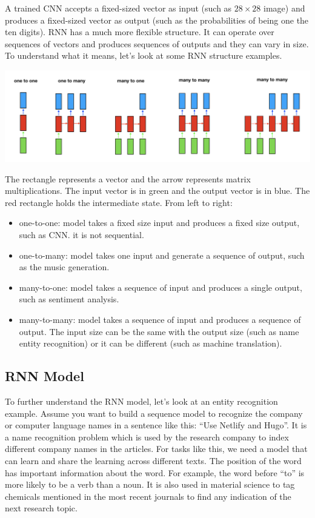 \documentclass[
  12pt,
]{krantz}
\providecommand{\tightlist}{%
  \setlength{\itemsep}{0pt}\setlength{\parskip}{0pt}}
\begin{document}
A trained CNN accepts a fixed-sized vector as input (such as \(28 \times 28\) image) and produces a fixed-sized vector as output (such as the probabilities of being one the ten digits). RNN has a much more flexible structure. It can operate over sequences of vectors and produces sequences of outputs and they can vary in size. To understand what it means, let's look at some RNN structure examples.

\includegraphics[width=1\textwidth,height=\textheight]{images/rnnstrs.png}

The rectangle represents a vector and the arrow represents matrix multiplications. The input vector is in green and the output vector is in blue. The red rectangle holds the intermediate state. From left to right:

\begin{itemize}
\tightlist
\item
  one-to-one: model takes a fixed size input and produces a fixed size output, such as CNN. it is not sequential.
\item
  one-to-many: model takes one input and generate a sequence of output, such as the music generation.
\item
  many-to-one: model takes a sequence of input and produces a single output, such as sentiment analysis.
\item
  many-to-many: model takes a sequence of input and produces a sequence of output. The input size can be the same with the output size (such as name entity recognition) or it can be different (such as machine translation).
\end{itemize}

\hypertarget{rnn-model}{%
\subsection{RNN Model}\label{rnn-model}}

To further understand the RNN model, let's look at an entity recognition example. Assume you want to build a sequence model to recognize the company or computer language names in a sentence like this: ``Use Netlify and Hugo''. It is a name recognition problem which is used by the research company to index different company names in the articles. For tasks like this, we need a model that can learn and share the learning across different texts. The position of the word has important information about the word. For example, the word before ``to'' is more likely to be a verb than a noun. It is also used in material science to tag chemicals mentioned in the most recent journals to find any indication of the next research topic.
\end{document}
